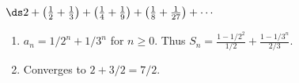 {$\ds 2+\left(\frac12+\frac13\right) + \left(\frac14+\frac19\right) + \left(\frac18+\frac1{27}\right)+\cdots$
}
{\begin{enumerate}
\item	$a_n = 1/2^n+1/3^n$ for $n\geq 0$. Thus $S_n = \frac{1-1/2^2}{1/2}+\frac{1-1/3^n}{2/3}$.
\item		Converges to $2+3/2 = 7/2$.
\end{enumerate}
}
